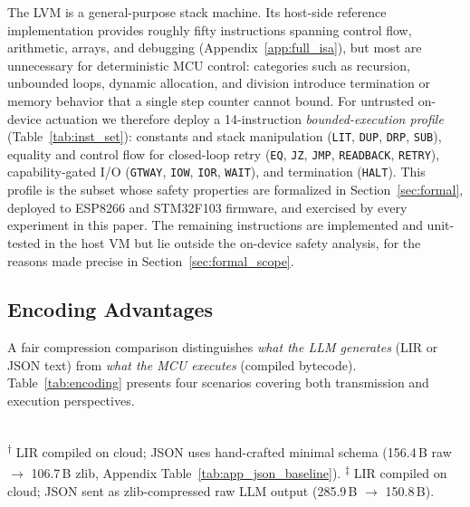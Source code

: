 \documentclass[a4paper,fleqn,longmktitle]{cas-dc}
\begin{document}
The LVM is a general-purpose stack machine. Its host-side reference implementation provides roughly fifty instructions spanning control flow, arithmetic, arrays, and debugging (Appendix~\ref{app:full_isa}), but most are unnecessary for deterministic MCU control: categories such as recursion, unbounded loops, dynamic allocation, and division introduce termination or memory behavior that a single step counter cannot bound. For untrusted on-device actuation we therefore deploy a 14-instruction \emph{bounded-execution profile} (Table~\ref{tab:inst_set}): constants and stack manipulation (\texttt{LIT}, \texttt{DUP}, \texttt{DRP}, \texttt{SUB}), equality and control flow for closed-loop retry (\texttt{EQ}, \texttt{JZ}, \texttt{JMP}, \texttt{READBACK}, \texttt{RETRY}), capability-gated I/O (\texttt{GTWAY}, \texttt{IOW}, \texttt{IOR}, \texttt{WAIT}), and termination (\texttt{HALT}). This profile is the subset whose safety properties are formalized in Section~\ref{sec:formal}, deployed to ESP8266 and STM32F103 firmware, and exercised by every experiment in this paper. The remaining instructions are implemented and unit-tested in the host VM but lie outside the on-device safety analysis, for the reasons made precise in Section~\ref{sec:formal_scope}.

\subsection{Encoding Advantages}
\label{sec:encoding}

A fair compression comparison distinguishes \emph{what the LLM generates} (LIR or JSON text) from \emph{what the MCU executes} (compiled bytecode). Table~\ref{tab:encoding} presents four scenarios covering both transmission and execution perspectives.

\begin{table}[t]
\centering
\caption{Fair four-scenario payload comparison (113 tasks, avg.\ bytes).}
\label{tab:encoding}
\footnotesize
{}\\[2pt]
{\footnotesize \textsuperscript{$\dagger$} LIR compiled on cloud; JSON uses hand-crafted minimal schema (156.4\,B raw $\to$ 106.7\,B zlib, Appendix Table~\ref{tab:app_json_baseline}). \textsuperscript{$\ddagger$} LIR compiled on cloud; JSON sent as zlib-compressed raw LLM output (285.9\,B $\to$ 150.8\,B).}
\end{table}
\end{document}
